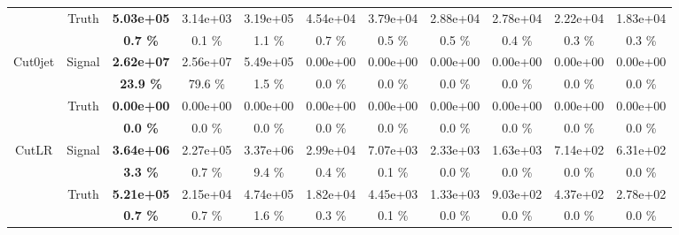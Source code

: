\begin{landscape}
\begin{table}
\begin{tabular}{|c|c|>{\bfseries}c|c|c|c|c|c|c|c|c|}
                                    & \multirow{2}{*}{Truth}    & 5.03e+05 & 3.14e+03 & 3.19e+05 & 4.54e+04 & 3.79e+04 & 2.88e+04 & 2.78e+04 & 2.22e+04 & 1.83e+04 \\
                                    &                           & 0.7 \%   & 0.1 \%   & 1.1 \%   & 0.7 \%   & 0.5 \%   & 0.5 \%   & 0.4 \%   & 0.3 \%   & 0.3 \%   \\
    \hline                                                              
    \hline                                                              
    \multirow{4}{*}{Cut0jet}        & \multirow{2}{*}{Signal}   & 2.62e+07 & 2.56e+07 & 5.49e+05 & 0.00e+00 & 0.00e+00 & 0.00e+00 & 0.00e+00 & 0.00e+00 & 0.00e+00 \\
                                    &                           & 23.9 \%  & 79.6 \%  & 1.5 \%   & 0.0 \%   & 0.0 \%   & 0.0 \%   & 0.0 \%   & 0.0 \%   & 0.0 \%   \\
    \cline{2-11}                                                                                    
                                    & \multirow{2}{*}{Truth}    & 0.00e+00 & 0.00e+00 & 0.00e+00 & 0.00e+00 & 0.00e+00 & 0.00e+00 & 0.00e+00 & 0.00e+00 & 0.00e+00 \\
                                    &                           & 0.0 \%   & 0.0 \%   & 0.0 \%   & 0.0 \%   & 0.0 \%   & 0.0 \%   & 0.0 \%   & 0.0 \%   & 0.0 \%   \\
    \hline                                                              
    \hline                                                              
    \multirow{4}{*}{CutLR}          & \multirow{2}{*}{Signal}   & 3.64e+06 & 2.27e+05 & 3.37e+06 & 2.99e+04 & 7.07e+03 & 2.33e+03 & 1.63e+03 & 7.14e+02 & 6.31e+02 \\
                                    &                           & 3.3 \%   & 0.7 \%   & 9.4 \%   & 0.4 \%   & 0.1 \%   & 0.0 \%   & 0.0 \%   & 0.0 \%   & 0.0 \%   \\
    \cline{2-11}                                                                                    
                                    & \multirow{2}{*}{Truth}    & 5.21e+05 & 2.15e+04 & 4.74e+05 & 1.82e+04 & 4.45e+03 & 1.33e+03 & 9.03e+02 & 4.37e+02 & 2.78e+02 \\
                                    &                           & 0.7 \%   & 0.7 \%   & 1.6 \%   & 0.3 \%   & 0.1 \%   & 0.0 \%   & 0.0 \%   & 0.0 \%   & 0.0 \%   \\
    \hline                                                              

\end{tabular}
\end{table}
\end{landscape}
